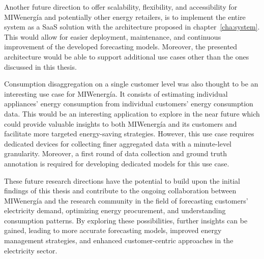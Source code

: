 Another future direction to offer scalability, flexibility, and accessibility for MIWenergía and potentially other energy retailers, is to implement the entire system as a SaaS solution with the architecture proposed in chapter~\ref{cha:system}.
This would allow for easier deployment, maintenance, and continuous improvement of the developed forecasting models.
Moreover, the presented architecture would be able to support additional use cases other than the ones discussed in this thesis.

Consumption disaggregation on a single customer level was also thought to be an interesting use case for MIWenergía.
It consists of estimating individual appliances' energy consumption from individual customers' energy consumption data.
This would be an interesting application to explore in the near future which could provide valuable insights to both MIWenergía and its customers and facilitate more targeted energy-saving strategies.
However, this use case requires dedicated devices for collecting finer aggregated data with a minute-level granularity.
Moreover, a first round of data collection and ground truth annotation is required for developing dedicated models for this use case.

These future research directions have the potential to build upon the initial findings of this thesis and contribute to the ongoing collaboration between MIWenergía and the research community in the field of forecasting customers' electricity demand, optimizing energy procurement, and understanding consumption patterns.
By exploring these possibilities, further insights can be gained, leading to more accurate forecasting models, improved energy management strategies, and enhanced customer-centric approaches in the electricity sector.
